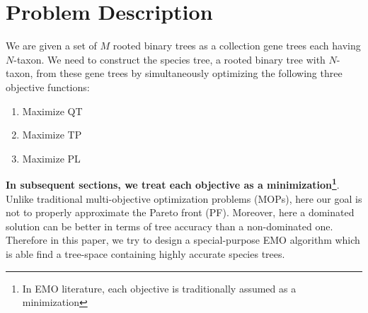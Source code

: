 \section{Problem Description}
\label{sec:problem}
We are given a set of $M$ rooted binary trees as a collection gene trees each having $N$-taxon. We need to construct the species tree, a rooted binary tree with $N$-taxon, from these gene trees by simultaneously optimizing the following three objective functions:  
\begin{enumerate}[label=$F\arabic*$.]
		
	\item Maximize QT 
	\item Maximize TP
	\item Maximize PL 
\end{enumerate}
\textbf{In subsequent sections, we treat each objective as a minimization\footnote{In EMO literature, each objective is traditionally assumed as a minimization }}. Unlike traditional multi-objective optimization
problems (MOPs), here our goal is not to properly approximate the Pareto front (PF). 
Moreover, here a dominated solution can be better in terms of tree accuracy than a non-dominated one. Therefore in this paper, we try to design a special-purpose EMO algorithm which is able find a tree-space containing highly accurate species trees. 
